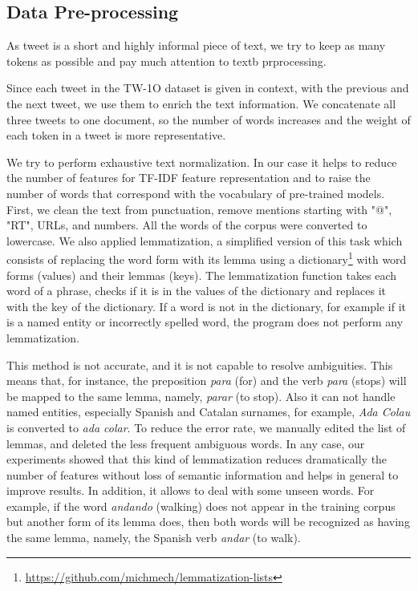 \documentclass[10pt, a4paper]{article}
\begin{document}
\subsection{Data Pre-processing}\label{sec:data-pre-processing}

As  tweet is a short and highly informal piece of text, we try to keep as many tokens as possible and pay much attention to textb prprocessing.

Since each tweet in the TW-1O dataset is given in context, with the previous and the next tweet, we use them to enrich the text information. We concatenate all three tweets to one document, so the number of words increases and the weight of each token in a tweet is more representative.

We try to perform exhaustive text normalization. In our case it helps to reduce the number of features for TF-IDF feature representation and to raise the number of words that correspond with the vocabulary of pre-trained models. First, we clean the text from punctuation, remove mentions starting with "@", "RT", URLs, and numbers. All the words of the corpus were converted to lowercase. We also applied lemmatization, a simplified version of this task which consists of replacing the word form with its lemma using a dictionary\footnote{\url{https://github.com/michmech/lemmatization-lists}} with word forms (values) and their lemmas (keys). The lemmatization function takes each word of a phrase, checks if it is in the values of the dictionary and replaces it with the key of the dictionary. If a word is not in the dictionary, for example if it is a named entity or incorrectly spelled word, the program does not perform any lemmatization.

This method is not accurate, and it is not capable to resolve ambiguities. This means that, for instance, the preposition \textit{para} (for) and the verb \textit{para} (stops) will be mapped to the same lemma, namely, \textit{parar} (to stop). Also it can not handle named entities, especially Spanish and Catalan surnames, for example, \textit{Ada Colau} is converted to \textit{ada colar}. To reduce the error rate, we manually edited the list of lemmas, and deleted the less frequent ambiguous words. In any case, our experiments showed that this kind of lemmatization reduces dramatically the number of features without loss of semantic information and helps in general to improve results. In addition, it allows to deal with some unseen words. For example, if the word \textit{andando} (walking) does not appear in the training corpus but another form of its lemma does, then both words will be recognized as having the same lemma, namely, the Spanish verb \textit{andar} (to walk).
\end{document}
